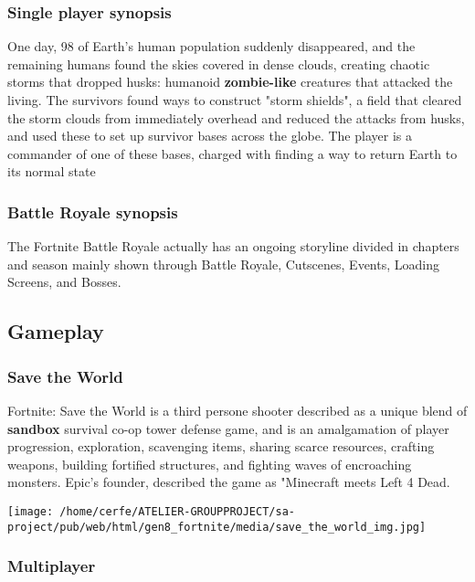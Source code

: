 \documentclass[a4paper,10pt]{book}
\begin{document}
 \subsubsection{Single player synopsis }
 
          One day, 98 of Earth's human population suddenly disappeared, and the remaining humans found the skies covered in dense clouds, creating chaotic storms that dropped husks:
          humanoid  \textbf{zombie-like }  creatures that attacked the living. The survivors found ways to construct "storm shields", a field that cleared the storm clouds from immediately
           overhead and reduced the attacks from husks, and used these to set up survivor bases across the globe. The player is a commander of one of these bases, charged with finding
           a way to return Earth to its normal state
         
 \subsubsection{ Battle Royale synopsis }
 
          The Fortnite Battle Royale actually has an ongoing storyline divided in chapters and season mainly shown through Battle Royale, Cutscenes, Events, Loading Screens, and Bosses.
         
 
 \subsection{ Gameplay }
 
 \subsubsection{Save the World }
 
        Fortnite: Save the World is a third persone shooter described as a unique blend of  \textbf{sandbox }  survival co-op tower defense game, and is an amalgamation of player progression, exploration,
        scavenging items, sharing scarce resources, crafting weapons, building fortified structures, and fighting waves of encroaching monsters. Epic's founder, described the game as "Minecraft meets Left 4 Dead.
         
 \texttt{[image: /home/cerfe/ATELIER-GROUPPROJECT/sa-project/pub/web/html/gen8\_fortnite/media/save\_the\_world\_img.jpg]}
 
 \subsubsection{Multiplayer }
 
\end{document}
